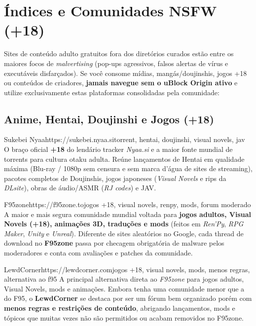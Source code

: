 \documentclass{pousadaguide}
\begin{document}
\section{Índices e Comunidades NSFW (+18)}

Sites de conteúdo adulto gratuitos fora dos diretórios curados estão entre os maiores focos de \emph{malvertising} (pop-ups agressivos, falsos alertas de vírus e executáveis disfarçados). Se você consome mídias, mangás/doujinshis, jogos +18 ou conteúdos de criadores, \textbf{jamais navegue sem o uBlock Origin ativo} e utilize exclusivamente estas plataformas consolidadas pela comunidade:

\subsection{Anime, Hentai, Doujinshi e Jogos (+18)}

\begin{ferramenta}[goat,logo=sukebei]{Sukebei Nyaa}{https://sukebei.nyaa.si}{torrent, hentai, doujinshi, visual novels, jav}
O braço oficial \textbf{+18} do lendário tracker \emph{Nyaa.si} e a maior fonte mundial de torrents para cultura otaku adulta. Reúne lançamentos de Hentai em qualidade máxima (Blu-ray / 1080p sem censura e sem marca d'água de sites de streaming), pacotes completos de Doujinshis, jogos japoneses (\emph{Visual Novels} e rips da \emph{DLsite}), obras de áudio/ASMR (\emph{RJ codes}) e JAV. 
\end{ferramenta}

\begin{ferramenta}[goat,logo=f95zone]{F95zone}{https://f95zone.to}{jogos +18, visual novels, renpy, mods, forum moderado}
A maior e mais segura comunidade mundial voltada para \textbf{jogos adultos, Visual Novels (+18), animações 3D, traduções e mods} (feitos em \emph{Ren'Py}, \emph{RPG Maker}, \emph{Unity} e \emph{Unreal}). Diferente de sites aleatórios no Google, cada thread de download no \textbf{F95zone} passa por checagem obrigatória de malware pelos moderadores e conta com avaliações e patches da comunidade. 
\end{ferramenta}

\begin{ferramenta}[recomendado,logo=lewdcorner]{LewdCorner}{https://lewdcorner.com}{jogos +18, visual novels, mods, menos regras, alternativa ao f95}
A principal alternativa direta ao \emph{F95zone} para jogos adultos, Visual Novels, mods e animações. Embora tenha uma comunidade menor que a do F95, o \textbf{LewdCorner} se destaca por ser um fórum bem organizado porém com \textbf{menos regras e restrições de conteúdo}, abrigando lançamentos, mods e tópicos que muitas vezes não são permitidos ou acabam removidos no F95zone. 
\end{ferramenta}
\end{document}
